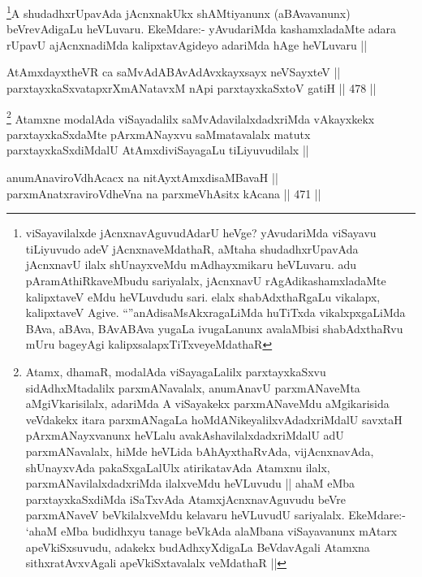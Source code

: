 \begin{artha}
\footnote{viSayavilalxde jAcnxnavAguvudAdarU heVge? yAvudariMda viSayavu tiLiyuvudo adeV jAcnxnaveMdathaR, aMtaha shudadhxrUpavAda jAcnxnavU ilalx shUnayxveMdu mAdhayxmikaru heVLuvaru. adu pAramAthiRkaveMbudu sariyalalx, jAcnxnavU rAgAdikashamxladaMte kalipxtaveV eMdu heVLuvdudu sari. elalx shabAdxthaRgaLu vikalapx, kalipxtaveV Agive. ``\stext''anAdisaMsAkxragaLiMda huTiTxda vikalxpxgaLiMda BAva, aBAva, BAvABAva yugaLa ivugaLanunx avalaMbisi shabAdxthaRvu mUru bageyAgi kalipxsalapxTiTxveyeMdathaR}A shudadhxrUpavAda jAcnxnakUkx shAMtiyanunx (aBAvavanunx) beVrevAdigaLu heVLuvaru. EkeMdare:- yAvudariMda kashamxladaMte adara rUpavU ajAcnxnadiMda kalipxtavAgideyo adariMda hAge heVLuvaru ||
\end{artha}

\begin{shl}
AtAmxdayxtheVR ca saMvAdABAvAdAvxkayxsayx neVSayxteV || \\
parxtayxkaSxvatapxrXmANatavxM nApi parxtayxkaSxtoV gatiH ||  478 ||  
\end{shl}

\begin{artha}
\footnote{Atamx, dhamaR, modalAda viSayagaLalilx parxtayxkaSxvu sidAdhxMtadalilx parxmANavalalx, anumAnavU parxmANaveMta aMgiVkarisilalx, adariMda A viSayakekx parxmANaveMdu aMgikarisida veVdakekx itara parxmANagaLa hoMdANikeyalilxvAdadxriMdalU savxtaH pArxmANayxvanunx heVLalu avakAshavilalxdadxriMdalU adU parxmANavalalx, hiMde heVLida bAhAyxthaRvAda, vijAcnxnavAda, shUnayxvAda pakaSxgaLalUlx atirikatavAda Atamxnu ilalx, parxmANavilalxdadxriMda ilalxveMdu heVLuvudu || ahaM eMba parxtayxkaSxdiMda iSaTxvAda AtamxjAcnxnavAguvudu beVre parxmANaveV beVkilalxveMdu kelavaru heVLuvudU sariyalalx. EkeMdare:- `ahaM eMba budidhxyu tanage beVkAda alaMbana viSayavanunx mAtarx apeVkiSxsuvudu, adakekx budAdhxyXdigaLa BeVdavAgali Atamxna sithxratAvxvAgali apeVkiSxtavalalx veMdathaR ||} Atamxne modalAda viSayadalilx saMvAdavilalxdadxriMda vAkayxkekx parxtayxkaSxdaMte pArxmANayxvu saMmatavalalx matutx parxtayxkaSxdiMdalU AtAmxdiviSayagaLu tiLiyuvudilalx ||
\end{artha}

\begin{shl}
anumAnaviroVdhAcacx na nitAyxtAmxdisaMBavaH || \\
parxmAnatxraviroVdheVna na parxmeVhAsitx kAcana ||  471 ||  
\end{shl}

